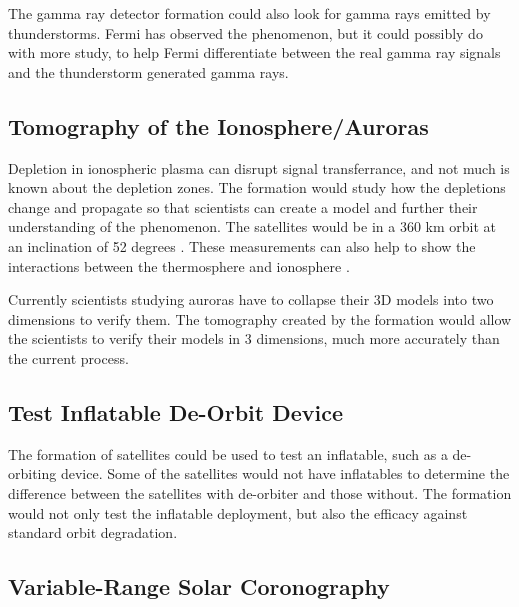 The gamma ray detector formation could also look for gamma rays emitted by thunderstorms. Fermi has observed the phenomenon, but it could possibly do with more study, to help Fermi differentiate between the real gamma ray signals and the thunderstorm generated gamma rays.\cite{Ref:Fermi} \cite{Ref:Kitts}

\subsection{Tomography of the Ionosphere/Auroras}

Depletion in ionospheric plasma can disrupt signal transferrance,
and not much is known about the depletion zones. The formation would
study how the depletions change and propagate so that scientists can
create a model and further their understanding of the phenomenon.
The satellites would be in a 360 km orbit at an inclination of 52
degrees \cite{Ref:Krause}\cite{Ref:Bracikowski}. These measurements
can also help to show the interactions between the thermosphere and
ionosphere \cite{Ref:Blalthazor}. 

Currently scientists studying auroras have to collapse their 3D models
into two dimensions to verify them. The tomography created by the
formation would allow the scientists to verify their models in 3 dimensions,
much more accurately than the current process. 


\subsection{Test Inflatable De-Orbit Device }

The formation of satellites could be used to test an inflatable, such
as a de-orbiting device. Some of the satellites would not have inflatables
to determine the difference between the satellites with de-orbiter
and those without. The formation would not only test the inflatable
deployment, but also the efficacy against standard orbit degradation. 

\subsection{Variable-Range Solar Coronography}


